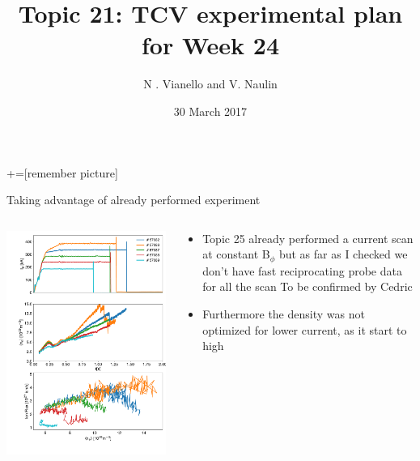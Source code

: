 \documentclass[10pt, compress]{beamer}
\title{Topic 21: TCV experimental plan for Week 24}
\date{30 March 2017}
\author[N. Vianello,  V. Naulin]{N . Vianello and V. Naulin}
\newcommand\Fontvi{\fontsize{8}{7.2}\selectfont}
\begin{document}
+=[remember picture]
\maketitle

\begin{frame}{Taking advantage of already performed experiment}
\vspace{-1cm}
\Fontvi
  \begin{columns}
    \begin{column}{0.6\textwidth}
      \includegraphics[width=\textwidth]{../../Experiments/TCV/analysis/pdfbox/CurrentScanTopic25}
    \end{column}
    \begin{column}{0.4\textwidth}
      \begin{itemize}
        \item Topic 25 already performed a current scan at
          constant B$_{\phi}$ but as far as I checked we don't have
          fast reciprocating probe data for all the scan \alert{To be
            confirmed by Cedric}
        \item Furthermore the density was not optimized for lower
          current, as it start to high
      \end{itemize}
    \end{column}
  \end{columns}
\end{frame}
\end{document}
